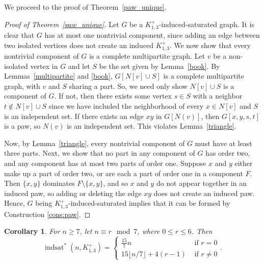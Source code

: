 \documentclass[12pt]{amsart}
\theoremstyle{plain}
\newtheorem{cor}{Corollary}[thm]
\theoremstyle{definition}
\theoremstyle{remark}
\newcommand{\sis}[2]{\ensuremath{{\operatorname{indsat}}^*(#1,#2)}\xspace}
\newcommand{\paw}{\ensuremath{K_{1,3}^+}\xspace}
\begin{document}
We proceed to the proof of Theorem~\ref{paw_unique}.
\begin{proof}[Proof of Theorem~\ref{paw_unique}]
Let $G$ be a \paw-induced-saturated graph.  It is clear that $G$ has at most one nontrivial component, since adding an edge between two isolated vertices does not create an induced $\paw$.  We now show that every nontrivial component of $G$ is a complete multipartite graph.
Let $v$ be a non-isolated vertex in $G$ and let $S$ be the set given by Lemma~\ref{book}.
By Lemmas~\ref{multipartite} and \ref{book}, $G[N[v] \cup S]$ is a complete multipartite graph, with $v$ and $S$ sharing a part.
So, we need only show $N[v] \cup S$ is a component of $G$. If not, then there exists some vertex $s \in S$ with a neighbor $t \not\in N[v]\cup S$ since we have included the neighborhood of every $x\in N[v]$ and $S$ is an independent set.
If there exists an edge $xy$ in $G[N(v)]$, then $G[x,y,s,t]$ is a paw, so $N(v)$ is an independent set.
This violates Lemma~\ref{triangle}.

Now, by Lemma~\ref{triangle}, every nontrivial component of $G$ must have at least three parts.
Next, we show that no part in any component of $G$ has order two, and any component has at most two parts of order one. Suppose $x$ and $y$ either make up a part of order two, or are each a part of order one in a component $F$. Then $\{x,y\}$ dominates $F\setminus\{x,y\}$, and so $x$ and $y$ do not appear together in an induced paw, so adding or deleting the edge $xy$ does not create an induced paw. Hence, $G$ being \paw-induced-saturated implies that it can be formed by Construction \ref{cons:paw}.
\end{proof}

\begin{cor}\label{sis paw}For $n \geq 7$, let $n\equiv r \mod 7$, where $0 \le r \le 6$. Then
\begin{equation*}\sis{n}{\paw} = \left\{
\begin{array}{cl}\displaystyle\frac{15}{7}n & \mbox{ if } r =0\\
15\lfloor n/7\rfloor+4(r-1) & \mbox{ if } r \neq 0\end{array}
\right..\end{equation*}
\end{cor}
\end{document}
